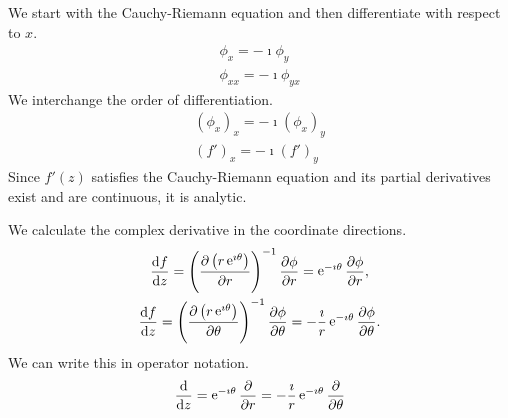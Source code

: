{%
\begin{Solution}
  \label{solution f(z) analytic f'(z)}
  We start with the Cauchy-Riemann equation and then differentiate 
  with respect to $x$.
  \begin{gather*}
    \phi_x = - \imath \phi_y 
    \\
    \phi_{x x} = - \imath \phi_{y x}
  \end{gather*}
  We interchange the order of differentiation.
  \begin{gather*}
    \left( \phi_x \right)_x = - \imath  \left( \phi_x \right)_y 
    \\
    \left( f' \right)_x = - \imath  \left( f' \right)_y
  \end{gather*}
  Since $f'(z)$ satisfies the Cauchy-Riemann equation and its 
  partial derivatives exist and are continuous, it is analytic.
\end{Solution}






\begin{Solution}
  \label{solution comp der polar}
  We calculate the complex derivative in the coordinate directions.
  \begin{gather*}
    \frac{\mathrm{d} f}{\mathrm{d} z} 
    = \left( \frac{\partial \left( r \mathop{\mathrm{e}}\nolimits^{\imath \theta} \right)}{\partial r} \right)^{-1}  
    \frac{\partial \phi}{\partial r} = \mathop{\mathrm{e}}\nolimits^{ -\imath \theta } \frac{\partial \phi}{\partial r}, 
    \\
    \frac{\mathrm{d} f}{\mathrm{d} z} 
    = \left( \frac{\partial \left( r \mathop{\mathrm{e}}\nolimits^{\imath \theta} \right)}{\partial \theta} \right)^{-1} 
    \frac{\partial \phi}{\partial \theta} = - \frac{\imath}{r} \mathop{\mathrm{e}}\nolimits^{-\imath \theta} \frac{\partial \phi}{\partial \theta}.
  \end{gather*}
  We can write this in operator notation.
  \[
  \frac{\mathrm{d}}{\mathrm{d} z} = \mathop{\mathrm{e}}\nolimits^{-\imath \theta} \frac{\partial}{\partial r} 
  = - \frac{\imath}{r} \mathop{\mathrm{e}}\nolimits^{-\imath \theta} \frac{\partial}{\partial \theta}
  \]
\end{Solution}












}
